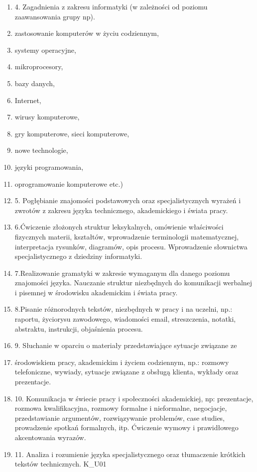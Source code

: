 \documentclass[12pt, a4paper]{article}
\begin{document}
\begin{enumerate}
  \item 4. Zagadnienia z zakresu informatyki (w zależności od poziomu zaawansowania grupy np).
  \item zastosowanie komputerów w życiu codziennym,
  \item systemy operacyjne,
  \item mikroprocesory,
  \item bazy danych,
  \item Internet,
  \item wirusy komputerowe,
  \item gry komputerowe, sieci komputerowe,
  \item nowe technologie,
  \item języki programowania,
  \item oprogramowanie komputerowe etc.)
  \item 5. Pogłębianie znajomości podstawowych oraz specjalistycznych wyrażeń i zwrotów z zakresu języka technicznego, akademickiego i świata pracy.
  \item 6.Ćwiczenie złożonych struktur leksykalnych, omówienie właściwości fizycznych materii, kształtów, wprowadzenie terminologii matematycznej, interpretacja rysunków, diagramów, opis procesu. Wprowadzenie słownictwa specjalistycznego z dziedziny informatyki.
  \item 7.Realizowanie gramatyki w zakresie wymaganym dla danego poziomu znajomości języka. Nauczanie struktur niezbędnych do komunikacji werbalnej i pisemnej w środowisku akademickim i świata pracy.
  \item 8.Pisanie różnorodnych tekstów, niezbędnych w pracy i na uczelni, np.: raportu, życiorysu zawodowego, wiadomości email, streszczenia, notatki, abstraktu, instrukcji, objaśnienia procesu.
  \item 9. Słuchanie w oparciu o materiały przedstawiające sytuacje związane ze
  \item środowiskiem pracy, akademickim i życiem codziennym, np.: rozmowy telefoniczne, wywiady, sytuacje związane z obsługą klienta, wykłady oraz prezentacje.
  \item 10. Komunikacja w świecie pracy i społeczności akademickiej, np: prezentacje, rozmowa kwalifikacyjna, rozmowy formalne i nieformalne, negocjacje, przedstawianie argumentów, rozwiązywanie problemów, case studies, prowadzenie spotkań formalnych, itp. Ćwiczenie wymowy i prawidłowego akcentowania wyrazów.
  \item 11. Analiza i rozumienie języka specjalistycznego oraz tłumaczenie krótkich tekstów technicznych. K\_U01

\end{enumerate}
\end{document}
